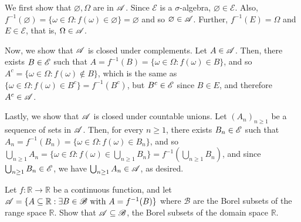 \begin{solution}
    We first show that $\varnothing, \Omega$ are in $\mathscr{A}$. Since $\mathscr{E}$ is a $\sigma$-algebra, $\varnothing \in \mathscr{E}$. Also, $f^{-1}(\varnothing) = \{ \omega \in \Omega: f(\omega) \in \varnothing \} = \varnothing$ and so $\varnothing \in \mathscr{A}$. Further, $f^{-1}(E) = \Omega$ and $E \in \mathscr{E}$, that is, $\Omega \in \mathscr{A}$.

    Now, we show that $\mathscr{A}$ is closed under complements. Let $A \in \mathscr{A}$. Then, there exists $B \in \mathscr{E}$ such that $A = f^{-1}(B) = \{ \omega \in \Omega: f(\omega) \in B \}$, and so $A^c = \{ \omega \in \Omega: f(\omega) \not\in B \}$, which is the same as $\{ \omega \in \Omega: f(\omega) \in B^c \} = f^{-1}(B^c)$, but $B^c \in \mathscr{E}$ since $B \in E$, and therefore $A^c \in \mathscr{A}$.

    Lastly, we show that $\mathscr{A}$ is closed under countable unions. Let $(A_n)_{n \geq 1}$ be a sequence of sets in $\mathscr{A}$. Then, for every $n \geq 1$, there exists $B_n \in \mathscr{E}$ such that $A_n = f^{-1}(B_n) = \{ \omega \in \Omega: f(\omega) \in B_n \}$, and so $\bigcup_{n \geq 1} A_n = \{ \omega \in \Omega : f(\omega) \in \bigcup_{n \geq 1} B_n \} = f^{-1}\left( \bigcup_{n \geq 1} B_n \right)$, and since $\bigcup_{n \geq 1} B_n \in \mathscr{E}$, we have $\bigcup_{n \geq 1} A_n \in \mathscr{A}$, as desired. 
\end{solution}


\begin{problem}
    Let $f: \mathbb{R} \to \mathbb{R}$ be a continuous function, and let $\mathscr{A} = \{ A \subseteq \mathbb{R}: \exists B \in \mathscr{B} \text{ with } A = f^{-1}(B) \}$ where $\mathscr{B}$ are the Borel subsets of the range space $\mathbb{R}$. Show that $\mathscr{A} \subseteq \mathscr{B}$, the Borel subsets of the domain space $\mathbb{R}$.
\end{problem}

